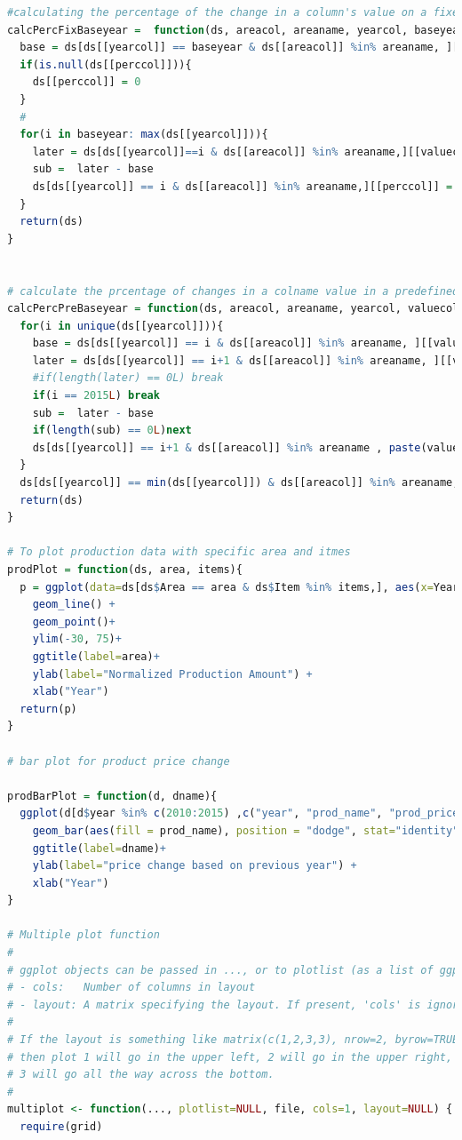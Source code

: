 \documentclass[11pt]{article}
\begin{document}
\begin{lstlisting}[language= R]
#calculating the percentage of the change in a column's value on a fixed base year 
calcPercFixBaseyear =  function(ds, areacol, areaname, yearcol, baseyear,valuecol, perccol){
  base = ds[ds[[yearcol]] == baseyear & ds[[areacol]] %in% areaname, ][[valuecol]]
  if(is.null(ds[[perccol]])){
    ds[[perccol]] = 0 
  }
  #
  for(i in baseyear: max(ds[[yearcol]])){
    later = ds[ds[[yearcol]]==i & ds[[areacol]] %in% areaname,][[valuecol]]
    sub =  later - base
    ds[ds[[yearcol]] == i & ds[[areacol]] %in% areaname,][[perccol]] = (sub / later) * 100
  }
  return(ds)
}


# calculate the prcentage of changes in a colname value in a predefined year, where the base is for every change is the value from the previous year.
calcPercPreBaseyear = function(ds, areacol, areaname, yearcol, valuecol){
  for(i in unique(ds[[yearcol]])){
    base = ds[ds[[yearcol]] == i & ds[[areacol]] %in% areaname, ][[valuecol]]
    later = ds[ds[[yearcol]] == i+1 & ds[[areacol]] %in% areaname, ][[valuecol]]
    #if(length(later) == 0L) break
    if(i == 2015L) break
    sub =  later - base
    if(length(sub) == 0L)next 
    ds[ds[[yearcol]] == i+1 & ds[[areacol]] %in% areaname , paste(valuecol, "Percent", sep = "_")]= (sub / later) * 100
  }
  ds[ds[[yearcol]] == min(ds[[yearcol]]) & ds[[areacol]] %in% areaname, paste(valuecol, "Percent", sep = "_")]= 0
  return(ds)
}

# To plot production data with specific area and itmes
prodPlot = function(ds, area, items){
  p = ggplot(data=ds[ds$Area == area & ds$Item %in% items,], aes(x=Year, y=Percentage, colour=Item)) +
    geom_line() +
    geom_point()+
    ylim(-30, 75)+
    ggtitle(label=area)+
    ylab(label="Normalized Production Amount") +
    xlab("Year")
  return(p)
}

# bar plot for product price change 

prodBarPlot = function(d, dname){
  ggplot(d[d$year %in% c(2010:2015) ,c("year", "prod_name", "prod_price_Percent")], aes(x = year, y = prod_price_Percent)) +
    geom_bar(aes(fill = prod_name), position = "dodge", stat="identity") +
    ggtitle(label=dname)+
    ylab(label="price change based on previous year") +
    xlab("Year")
}

# Multiple plot function
#
# ggplot objects can be passed in ..., or to plotlist (as a list of ggplot objects)
# - cols:   Number of columns in layout
# - layout: A matrix specifying the layout. If present, 'cols' is ignored.
#
# If the layout is something like matrix(c(1,2,3,3), nrow=2, byrow=TRUE),
# then plot 1 will go in the upper left, 2 will go in the upper right, and
# 3 will go all the way across the bottom.
#
multiplot <- function(..., plotlist=NULL, file, cols=1, layout=NULL) {
  require(grid)
  

\end{lstlisting}
\end{document}
